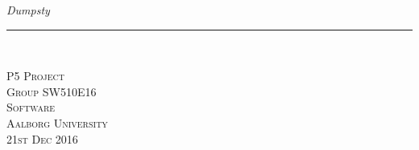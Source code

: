 \thispagestyle{empty}
\begin{flushright}
\vspace{3cm}

\phantom{hul}

\phantom{hul}

\phantom{hul}

\textsl{\Huge Dumpsty} \\ \vspace{1cm}

\rule{13cm}{3mm} \\ \vspace{1.5cm}
\vspace{1cm}



\vspace{7cm} 
\textsc{\Large P5 Project \\
Group SW510E16 \\
Software\\
Aalborg University\\
21st Dec 2016\\}
\end{flushright}
